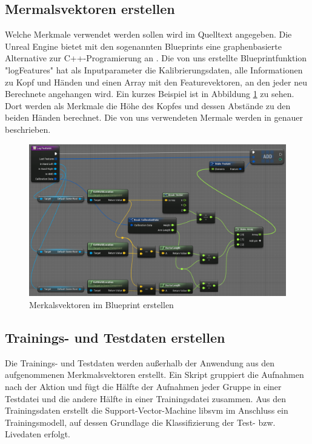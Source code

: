 \subsection{Mermalsvektoren erstellen}
Welche Merkmale verwendet werden sollen wird im Quelltext angegeben. Die Unreal Engine bietet mit den sogenannten Blueprints eine graphenbasierte Alternative zur C++-Programierung an \cite{Blueprints}. Die von uns erstellte Blueprintfunktion "logFeatures" hat als Inputparameter die Kalibrierungsdaten, alle Informationen zu Kopf und Händen und einen Array mit den Featurevektoren, an den jeder neu Berechnete angehangen wird. Ein kurzes Beispiel ist in Abbildung \ref{fig:LogFeatures} zu sehen. Dort werden als Merkmale die Höhe des Kopfes und dessen Abstände zu den beiden Händen berechnet. Die von uns verwendeten Mermale werden in \cite{Features} genauer beschrieben. 
\begin{figure}[hbtp]
\includegraphics[width=1.0\linewidth]{LogFeatures2.png}
\caption{Merkalsvektoren im Blueprint erstellen}
\label{fig:LogFeatures}
\end{figure}

\subsection{Trainings- und Testdaten erstellen}
Die Trainings- und Testdaten werden außerhalb der Anwendung aus den aufgenommenen Merkmalsvektoren erstellt. Ein Skript gruppiert die Aufnahmen nach der Aktion und fügt die Hälfte der Aufnahmen jeder Gruppe in einer Testdatei und die andere Hälfte in einer Trainingsdatei zusammen. Aus den Trainingsdaten erstellt die Support-Vector-Machine libsvm \cite{libsvm} im Anschluss ein Trainingsmodell, auf dessen Grundlage die Klassifizierung der Test- bzw. Livedaten erfolgt.

